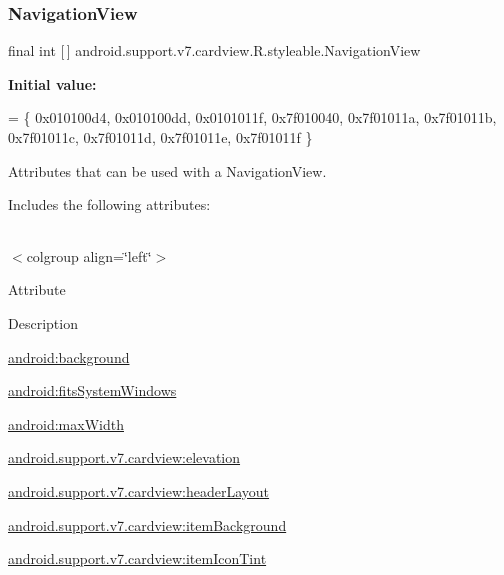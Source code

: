 \subsubsection{\texorpdfstring{Navigation\+View}{NavigationView}}
{\footnotesize\ttfamily final int \mbox{[}$\,$\mbox{]} android.\+support.\+v7.\+cardview.\+R.\+styleable.\+Navigation\+View\hspace{0.3cm}{\ttfamily [static]}}

{\bfseries Initial value\+:}
\begin{DoxyCode}
= \{
            0x010100d4, 0x010100dd, 0x0101011f, 0x7f010040,
            0x7f01011a, 0x7f01011b, 0x7f01011c, 0x7f01011d,
            0x7f01011e, 0x7f01011f
        \}
\end{DoxyCode}
Attributes that can be used with a Navigation\+View. 

Includes the following attributes\+:

\tabulinesep=1mm
\begin{longtabu} spread 0pt [c]{*{0}{|X[-1]}|}
\hline
\end{longtabu}
$<$colgroup align=\char`\"{}left\char`\"{}$>$ 

Attribute

Description 

{\ttfamily \hyperlink{classandroid_1_1support_1_1v7_1_1cardview_1_1R_1_1styleable_a94e2a218f669083b762cff03f9744e3b}{android\+:background}}

{\ttfamily \hyperlink{classandroid_1_1support_1_1v7_1_1cardview_1_1R_1_1styleable_aa6f714233e453699e4d54ad9df87c26f}{android\+:fits\+System\+Windows}}

{\ttfamily \hyperlink{classandroid_1_1support_1_1v7_1_1cardview_1_1R_1_1styleable_ac1b3e741214cbc01ba4889dad538b752}{android\+:max\+Width}}

{\ttfamily \hyperlink{classandroid_1_1support_1_1v7_1_1cardview_1_1R_1_1styleable_af1ff40b9d01cd7c460e4f0b93cbb4bdf}{android.\+support.\+v7.\+cardview\+:elevation}}

{\ttfamily \hyperlink{classandroid_1_1support_1_1v7_1_1cardview_1_1R_1_1styleable_a295bd44f7203a8812e422aecbcc036d4}{android.\+support.\+v7.\+cardview\+:header\+Layout}}

{\ttfamily \hyperlink{classandroid_1_1support_1_1v7_1_1cardview_1_1R_1_1styleable_a1a21d53170287aa58f15ebb0407ff257}{android.\+support.\+v7.\+cardview\+:item\+Background}}

{\ttfamily \hyperlink{classandroid_1_1support_1_1v7_1_1cardview_1_1R_1_1styleable_a2ab0ca375d97bd7ddedbe29e6eee2165}{android.\+support.\+v7.\+cardview\+:item\+Icon\+Tint}}


